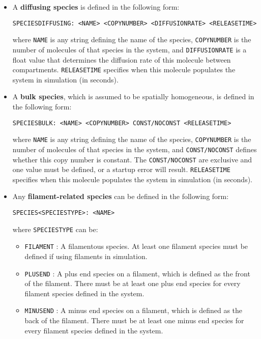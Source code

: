\documentclass[11pt, oneside]{article}   	%
\begin{document}
\begin{itemize}
\item 
A \textbf{diffusing species} is defined in the following form:\newline\newline \centerline{\texttt{SPECIESDIFFUSING: <NAME> <COPYNUMBER> <DIFFUSIONRATE> <RELEASETIME>}}\newline\newline where \texttt{NAME} is any string defining the name of the species, \texttt{COPYNUMBER} is the number of molecules of that species in the system, and \texttt{DIFFUSIONRATE} is a float value that determines the diffusion rate of this molecule between compartments. \texttt{RELEASETIME} specifies when this molecule populates the system in simulation (in seconds).
\item
A \textbf{bulk species}, which is assumed to be spatially homogeneous, is defined in the following form:\newline\newline\centerline{\texttt{SPECIESBULK: <NAME> <COPYNUMBER> CONST/NOCONST <RELEASETIME>}}\newline\newline where \texttt{NAME} is any string defining the name of the species, \texttt{COPYNUMBER} is the number of molecules of that species in the system, and \texttt{CONST/NOCONST} defines whether this copy number is constant. The \texttt{CONST/NOCONST} are exclusive and one value must be defined, or a startup error will result. \texttt{RELEASETIME} specifies when this molecule populates the system in simulation (in seconds).
\item
Any \textbf{filament-related species} can be defined in the following form:\newline\newline\centerline{\texttt{SPECIES<SPECIESTYPE>: <NAME>}}\newline\newline where \texttt{SPECIESTYPE} can be:
\begin{itemize}
\item \texttt{FILAMENT} : A filamentous species. At least one filament species must be defined if using filaments in simulation.
\item \texttt{PLUSEND} : A plus end species on a filament, which is defined as the front of the filament. There must be at least one plus end species for every filament species defined in the system.
\item \texttt{MINUSEND} : A minus end species on a filament, which is defined as the back of the filament. There must be at least one minus end species for every filament species defined in the system.

\end{itemize}
\end{itemize}
\end{document}
